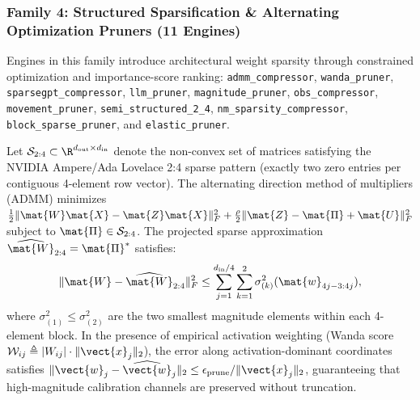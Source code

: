\subsubsection{Family 4: Structured Sparsification \& Alternating Optimization Pruners (11 Engines)}
Engines in this family introduce architectural weight sparsity through constrained optimization and importance-score ranking: \texttt{admm\_compressor}, \texttt{wanda\_pruner}, \texttt{sparsegpt\_compressor}, \texttt{llm\_pruner}, \texttt{magnitude\_pruner}, \texttt{obs\_compressor}, \texttt{movement\_pruner}, \texttt{semi\_structured\_2\_4}, \texttt{nm\_sparsity\_compressor}, \texttt{block\_sparse\_pruner}, and \texttt{elastic\_pruner}.
\begin{theorem}
\label{thm:frob_admm_pruner}
Let $\mathcal{S}_{2:4} \subset \R^{d_{\text{out}} \times d_{\text{in}}}$ denote the non-convex set of matrices satisfying the NVIDIA Ampere/Ada Lovelace 2:4 sparse pattern (exactly two zero entries per contiguous 4-element row vector). The alternating direction method of multipliers (ADMM) minimizes $\frac{1}{2}\|\mat{W}\mat{X} - \mat{Z}\mat{X}\|_F^2 + \frac{\rho}{2}\|\mat{Z} - \mat{\Pi} + \mat{U}\|_F^2$ subject to $\mat{\Pi} \in \mathcal{S}_{2:4}$. The projected sparse approximation $\widehat{\mat{W}}_{2:4} = \mat{\Pi}^*$ satisfies:
\begin{equation}
\|\mat{W} - \widehat{\mat{W}}_{2:4}\|_F^2 \le \sum_{j=1}^{d_{\text{in}}/4} \sum_{k=1}^2 \sigma_{(k)}^2(\mat{w}_{4j-3:4j}),
\label{eq:frob_bound_admm_family}
\end{equation}
where $\sigma_{(1)}^2 \le \sigma_{(2)}^2$ are the two smallest magnitude elements within each 4-element block. In the presence of empirical activation weighting (Wanda score $\mathcal{W}_{ij} \triangleq |W_{ij}| \cdot \|\vect{x}_j\|_2$), the error along activation-dominant coordinates satisfies $\|\vect{w}_j - \widehat{\vect{w}}_j\|_2 \le \epsilon_{\text{prune}} / \|\vect{x}_j\|_2$, guaranteeing that high-magnitude calibration channels are preserved without truncation.
\end{theorem}

